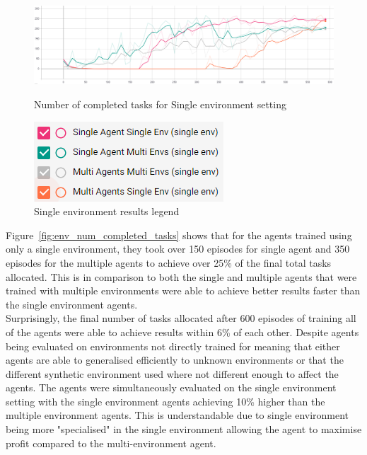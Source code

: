 \begin{figure}[H]
    \centering
    \begin{minipage}{0.75\linewidth}
        \centering
        \includegraphics[width=\linewidth]{figures/5_evaluation_figs/env_training_fig/single_env_num_completed_tasks.png}
        \caption{Number of completed tasks for Single environment setting}
        \label{fig:single_env_num_completed_tasks}
    \end{minipage}\hfill
    \begin{minipage}{0.25\linewidth}
        \centering
        \includegraphics[width=\linewidth]{figures/5_evaluation_figs/env_training_fig/single_env_legend.png}
        \caption{Single environment results legend}
        \label{fig:single_env_legend}
    \end{minipage}
\end{figure}

Figure~\ref{fig:env_num_completed_tasks} shows that for the agents trained using only a single environment, they took
over 150 episodes for single agent and 350 episodes for the multiple agents to achieve over 25\% of the final total
tasks allocated. This is in comparison to both the single and multiple agents that were trained with multiple
environments were able to achieve better results faster than the single environment agents. \\
Surprisingly, the final number of tasks allocated after 600 episodes of training all of the agents were able to achieve
results within 6\% of each other. Despite agents being evaluated on environments not directly trained for meaning that
either agents are able to generalised efficiently to unknown environments or that the different synthetic environment
used where not different enough to affect the agents. The agents were simultaneously evaluated on the single environment
setting with the single environment agents achieving 10\% higher than the multiple environment agents. This is
understandable due to single environment being more "specialised" in the single environment allowing the agent to
maximise profit compared to the multi-environment agent.

